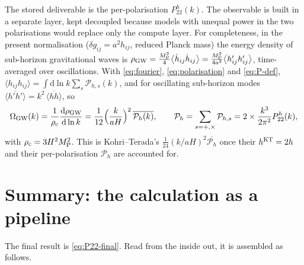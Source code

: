 \documentclass[11pt,a4paper]{article}
\newcommand{\cP}{\mathcal{P}}
\newcommand{\MP}{M_{\mathrm{P}}}
\newcommand{\dd}{\mathrm{d}}
\newcommand{\Tavg}[1]{\overline{#1}}
\theoremstyle{remark}
\begin{document}
The stored deliverable is the per-polarisation $P^h_{22}(k)$. The observable is built in a separate layer, kept decoupled because models with unequal power in the two polarisations would replace only the compute layer. For completeness, in the present normalisation ($\delta g_{ij} = a^2h_{ij}$, reduced Planck mass) the energy density of sub-horizon gravitational waves is $\rho_{\rm GW} = \tfrac{\MP^2}{4}\big\langle\dot h_{ij}\dot h_{ij}\big\rangle = \tfrac{\MP^2}{4a^2}\big\langle h_{ij}'h_{ij}'\big\rangle$, time-averaged over oscillations. With \eqref{eq:fourier}, \eqref{eq:polarisation} and \eqref{eq:P-def}, $\langle h_{ij}h_{ij}\rangle = \int\dd\ln k\sum_s\cP_{h,s}(k)$, and for oscillating sub-horizon modes $\Tavg{\langle h'h'\rangle} = k^2\,\Tavg{\langle hh\rangle}$, so
\begin{equation}
\Omega_{\rm GW}(k) = \frac{1}{\rho_{\rm c}}\frac{\dd\rho_{\rm GW}}{\dd\ln k}
= \frac{1}{12}\Big(\frac{k}{aH}\Big)^2\,\Tavg{\cP_{h}(k)},\qquad
\cP_h = \sum_{s=+,\times}\cP_{h,s} = 2\times\frac{k^3}{2\pi^2}P^h_{22}(k),
\label{eq:omega-gw}
\end{equation}
with $\rho_{\rm c} = 3H^2\MP^2$. This is Kohri--Terada's $\tfrac{1}{24}(k/aH)^2\Tavg{\cP_h}$ once their $h^{\rm KT} = 2h$ and their per-polarisation $\cP_h$ are accounted for.

\section{Summary: the calculation as a pipeline}
\label{sec:summary}

The final result is \eqref{eq:P22-final}. Read from the inside out, it is assembled as follows.
\end{document}
